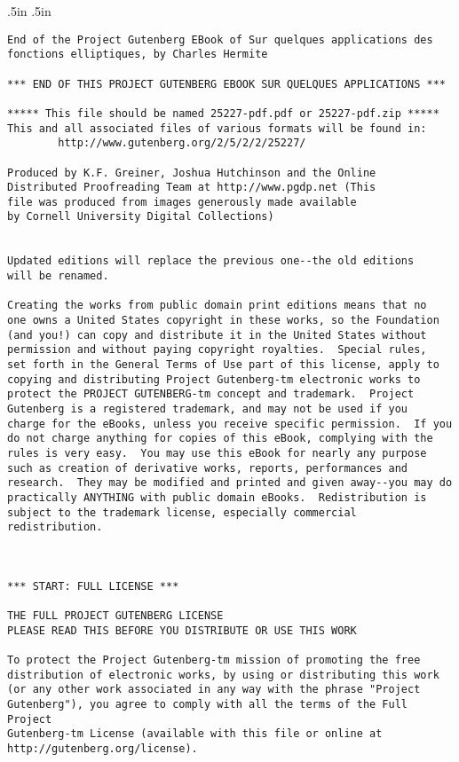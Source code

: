 \documentclass[11pt,leqno,oneside,letterpaper]{book}[2005/09/16]
\begin{document}
\clearpage
{}
\advance\oddsidemargin-0.25in %
\advance\evensidemargin-0.25in %
\advance\hsize.5in
\advance\textwidth.5in
\small
\begin{verbatim}
End of the Project Gutenberg EBook of Sur quelques applications des
fonctions elliptiques, by Charles Hermite

*** END OF THIS PROJECT GUTENBERG EBOOK SUR QUELQUES APPLICATIONS ***

***** This file should be named 25227-pdf.pdf or 25227-pdf.zip *****
This and all associated files of various formats will be found in:
        http://www.gutenberg.org/2/5/2/2/25227/

Produced by K.F. Greiner, Joshua Hutchinson and the Online
Distributed Proofreading Team at http://www.pgdp.net (This
file was produced from images generously made available
by Cornell University Digital Collections)


Updated editions will replace the previous one--the old editions
will be renamed.

Creating the works from public domain print editions means that no
one owns a United States copyright in these works, so the Foundation
(and you!) can copy and distribute it in the United States without
permission and without paying copyright royalties.  Special rules,
set forth in the General Terms of Use part of this license, apply to
copying and distributing Project Gutenberg-tm electronic works to
protect the PROJECT GUTENBERG-tm concept and trademark.  Project
Gutenberg is a registered trademark, and may not be used if you
charge for the eBooks, unless you receive specific permission.  If you
do not charge anything for copies of this eBook, complying with the
rules is very easy.  You may use this eBook for nearly any purpose
such as creation of derivative works, reports, performances and
research.  They may be modified and printed and given away--you may do
practically ANYTHING with public domain eBooks.  Redistribution is
subject to the trademark license, especially commercial
redistribution.



*** START: FULL LICENSE ***

THE FULL PROJECT GUTENBERG LICENSE
PLEASE READ THIS BEFORE YOU DISTRIBUTE OR USE THIS WORK

To protect the Project Gutenberg-tm mission of promoting the free
distribution of electronic works, by using or distributing this work
(or any other work associated in any way with the phrase "Project
Gutenberg"), you agree to comply with all the terms of the Full Project
Gutenberg-tm License (available with this file or online at
http://gutenberg.org/license).



\end{verbatim}
\end{document}
